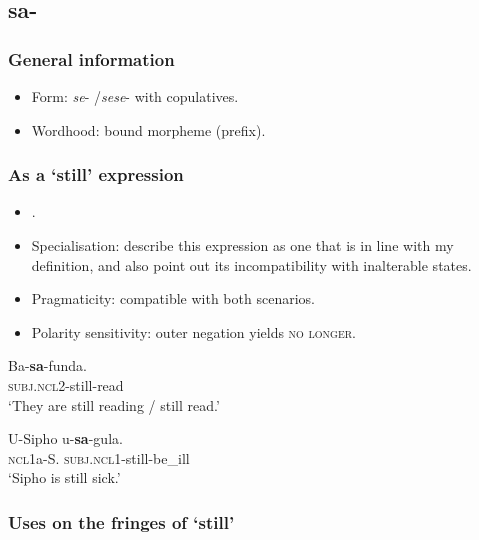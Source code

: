 \subsection{sa-}
\subsubsection{General information}
\begin{itemize}
	\item Form: \textit{se}- /\textit{sese}- with copulatives.
	\item Wordhood: bound morpheme (prefix).
\end{itemize}


\subsubsection{As a  \lq still\rq{ }expression}
\begin{itemize}
	\item \textcite{CranePersohn2021}.
	\item Specialisation: \textcite{CranePersohn2021} describe this expression as one that is in line with my definition, and also point out its incompatibility with inalterable states.
	\item Pragmaticity: compatible with both scenarios.
	\item Polarity sensitivity: outer negation yields \textsc{no longer}.
\end{itemize}

\begin{exe}
	\ex
	\gll Ba-\textbf{sa}-funda.\\
	\textsc{subj}.\textsc{ncl}2-still-read\\
	\glt \lq They are still reading / still read.' \parencite[237]{CranePersohn2021}

	\ex
	\gll U-Sipho u-\textbf{sa}-gula.\\
	\textsc{ncl}1a-S. \textsc{subj}.\textsc{ncl}1-still-be\_ill\\
	\glt \lq Sipho is still sick.' \parencite[237]{CranePersohn2021}
\end{exe}

\subsubsection{Uses on the fringes of \lq{}still\rq{}}
